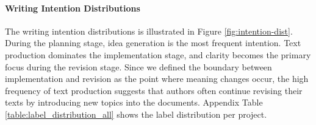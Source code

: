 



\paragraph{Writing Intention Distributions} The writing intention distributions is illustrated in Figure \ref{fig:intention-dist}. During the planning stage, idea generation is the most frequent intention.  Text production dominates the implementation stage, and clarity becomes the primary focus during the revision stage. Since we defined the boundary between implementation and revision as the point where meaning changes occur, the high frequency of text production suggests that authors often continue revising their texts by introducing new topics into the documents.  Appendix Table \ref{table:label_distribution_all} shows the label distribution per project. 

